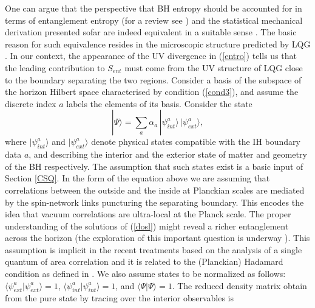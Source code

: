 \documentclass[aps, nofootinbib,superscriptaddress,12pt]{revtex4-2}
\def\be{\begin{equation}}
\def\ee{\end{equation}}
\begin{document}
One can argue that the perspective that BH entropy should be accounted for in terms of entanglement entropy  \cite{Bombelli:1986rw}  (for a review see \cite{Solodukhin:2011gn})  and the
statistical mechanical derivation presented sofar are indeed  equivalent in a suitable sense \cite{Perez:2014ura}.  The basic reason for such equivalence resides in the microscopic structure predicted by LQG \cite{Bianchi:2012ui, Bianchi:2012ev, Chirco:2014saa}.  
In our context, the appearance of the UV divergence in (\ref{entro}) tells us that the leading contribution to $S_{ent}$ must come
from the UV structure of LQG close to the boundary separating the two regions. 
Consider a basis  of the subspace of the horizon Hilbert space characterised by condition (\ref{cond3}), and assume the discrete index $a$ labels the elements of its basis. 
Consider the  state 
\be \label{here}
|\Psi\rangle=\sum\limits_{a} \alpha_{ a } \,  |\psi^{a}_{int}\rangle\, |\psi^{a}_{ext}\rangle, \ee 
where $|\psi^{a}_{int}\rangle$ and $|\psi^{a}_{ext}\rangle$  denote physical states compatible with the IH boundary data $a$, and describing  the interior and the exterior state 
of matter and geometry of the BH respectively. The assumption that such states exist is a basic input of Section \ref{CSQ}. 
In the form of the  equation above we are assuming that correlations  between the outside and the inside at Planckian scales  are  mediated by the
spin-network links puncturing the separating boundary.
This encodes the idea that vacuum correlations are ultra-local at the Planck scale. The proper understanding of the solutions of (\ref{dosl}) might reveal a richer entanglement across the horizon (the exploration of this important question is underway \cite{Bianchi:2016tmw}). 
This assumption is implicit in the recent treatments \cite{Bianchi:2012ui} based on the analysis of a single quantum of area correlation and it is related to the
(Planckian) Hadamard condition as defined in \cite{Chirco:2014saa}. 
We also assume states to be normalized as follows: $\langle \psi_{ext}^a|\psi_{ext}^a\rangle=1$, $\langle \psi_{int}^a|\psi_{int}^a\rangle=1$, and  $\langle \Psi|\Psi\rangle=1$.
The reduced density matrix obtain from the pure state by tracing over the interior observables is
\end{document}
